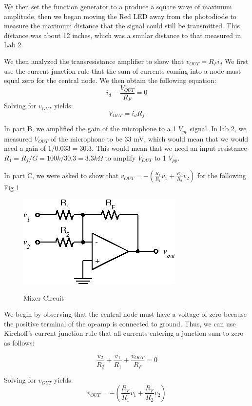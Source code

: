 \documentclass[10pt]{article}
\begin{document}
We then set the function generator to a produce a square wave of maximum amplitude, then we began moving the Red LED away from the photodiode to measure the maximum distance that the signal could still be transmitted. This distance was about 12 inches, which was a smiilar distance to that measured in Lab 2. 

We then analyzed the transresistance amplifier to show that $v_{OUT} = R_Fi_d$
We first use the current junction rule that the sum of currents coming into a node must equal zero for the central node. We then obtain the following equation: \\ 
$$i_d - \frac{V_{OUT}}{R_F} = 0$$
Solving for $v_{OUT}$ yields:
 $$V_{OUT} = i_dR_f$$
 
In part B, we amplified the gain of the microphone to a 1 $V_{pp}$ signal. In lab 2, we measured $V_{OUT}$ of the microphone to be 33 mV, which would mean that we would need a gain of $1/0.033 = 30.3$. This would mean that we need an input resistance $R_1 = R_f/G = 100k/30.3 = 3.3 k\Omega$ to amplify $V_{OUT}$ to 1 $V_{pp}$. 

In part C, we were asked to show that $v_{OUT} = -(\frac{R_F}{R_1}v_1 + \frac{R_F}{R_2}v_2)$ for the following Fig \ref{fig:mixer}

\begin{centering}
	\begin{figure} [H]
		\centering
		\includegraphics[scale=0.50]{images/mixercircuit.png}\
		\caption{Mixer Circuit}
		\label{fig:mixer}
	\end{figure}
\end{centering}

We begin by observing that the central node must have a voltage of zero because the positive terminal of the op-amp is connected to ground. Thus, we can use Kirchoff's current junction rule that all currents entering a junction sum to zero as follows:

$$\frac{v_2}{R_2} + \frac{v_1}{R_1} + \frac{v_{OUT}}{R_F} = 0$$

Solving for $v_{OUT}$ yields:$$v_{OUT} = -(\frac{R_F}{R_1}v_1 + \frac{R_F}{R_2}v_2)$$
\end{document}
